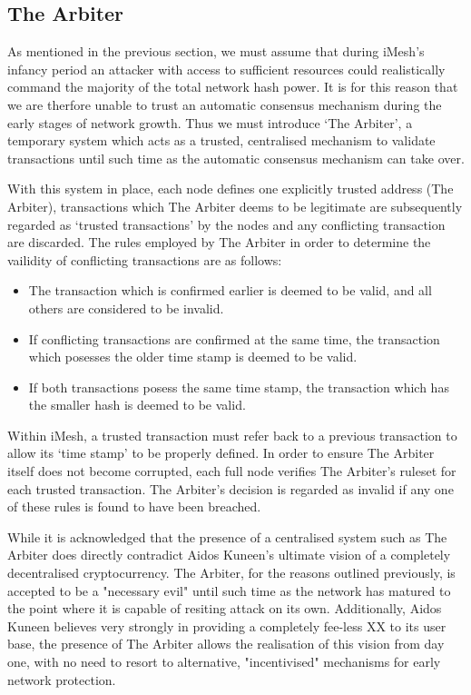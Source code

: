 \documentclass[a4paper,10pt,twocolumn]{article}
\begin{document}
\subsection{The Arbiter}

As mentioned in the previous section, we must assume that during iMesh's infancy period an attacker with access to sufficient resources 
could realistically command the majority of the total network hash power. It is for this reason that we are therfore unable to trust an 
automatic consensus mechanism during the early stages of network growth. Thus we must introduce `The Arbiter', a temporary system which 
acts as a trusted, centralised mechanism to validate transactions until such time as the automatic consensus mechanism can take over.

With this system in place, each node defines one explicitly trusted address (The Arbiter), transactions which The Arbiter deems to be 
legitimate are subsequently regarded as `trusted transactions' by the nodes and any conflicting transaction are discarded. The rules 
employed by The Arbiter in order to determine the vailidity of conflicting transactions are as follows:

\begin{itemize}
	\item The transaction which is confirmed earlier is deemed to be valid, and all others are considered to be invalid.
	\item If conflicting transactions are confirmed at the same time, the transaction which posesses the older time stamp is deemed 
	to be valid.
	\item If both transactions posess the same time stamp, the transaction which has the smaller hash
	is deemed to be valid.
\end{itemize}

Within iMesh, a trusted transaction must refer back to a previous transaction to allow its `time stamp' to be properly defined.
In order to ensure The Arbiter itself does not become corrupted, each full node verifies The Arbiter's ruleset for each trusted 
transaction. The Arbiter's decision is regarded as invalid if any one of these rules is found to have been breached.

While it is acknowledged that the presence of a centralised system such as The Arbiter does directly contradict Aidos Kuneen's ultimate 
vision of a completely decentralised cryptocurrency. The Arbiter, for the reasons outlined previously, is accepted to be a
"necessary evil" until such time as the network has matured to the point where it is capable of resiting attack on its own. 
Additionally, Aidos Kuneen believes very strongly in providing a completely fee-less XX to its user base, the presence of The Arbiter 
allows the realisation of this vision from day one, with no need to resort to alternative, "incentivised" mechanisms for early network 
protection.
\end{document}
